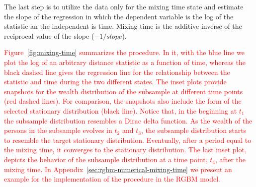 \documentclass[11pt]{article}
\newcommand{\Fref}[1]{Figure~\ref{fig:#1}}
\numberwithin{equation}{section}
\begin{document}
The last step is to utilize the data only for the mixing time state and estimate the slope of the regression in which the dependent variable is the log of the statistic an the independent is time. Mixing time is the additive inverse of the reciprocal value of the slope ($-1/slope$).

\textcolor{red}{\Fref{mixing-time} summarizes the procedure. In it, with the blue line we plot the log of an arbitrary distance statistic as a function of time, whereas the black dashed line gives the regression line for the relationship between the statistic and time during the two different states. The inset plots provide snapshots for the wealth distribution of the subsample at different time points (red dashed lines). For comparison, the snapshots also include the form of the selected stationary distribution (black line). Notice that, in the beginning at $t_1$ the subsample distribution resembles a Dirac delta function. As the wealth of the persons in the subsample evolves in $t_2$ and $t_3$, the subsample distribution starts to resemble the target stationary distribution. Eventually, after a period equal to the mixing time, it converges to the stationary distribution. The last inset plot, depicts the behavior of the subsample distribution at a time point, $t_4$, after the mixing time. In Appendix~\ref{sec:rgbm-numerical-mixing-time} we present an example for the implementation of the procedure in the RGBM model.}
\end{document}

